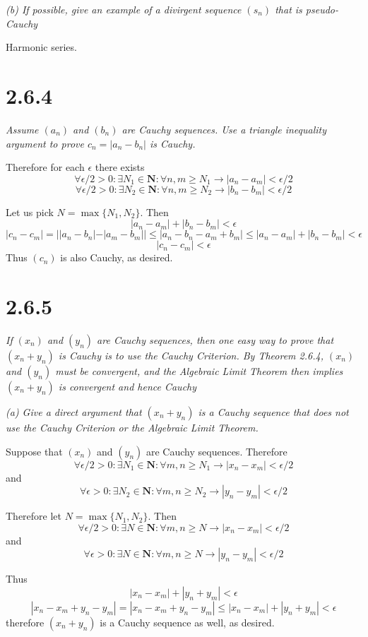 \documentclass[11pt,oneside,titlepage]{book}
\begin{document}
\textit{(b) If possible, give an example of a divirgent sequence $(s_n)$ that
  is pseudo-Cauchy}

Harmonic series.

\section*{2.6.4}
\textit{Assume $(a_n)$ and $(b_n)$ are Cauchy sequences. Use a triangle
  inequality argument to prove $c_n = |a_n - b_n|$ is Cauchy.}

Therefore for each $\epsilon$ there exists
$$\forall \epsilon/2 > 0: \exists N_1 \in \textbf{N}: \forall n,m \geq N_1 \to
|a_n - a_m| < \epsilon/2$$
$$\forall \epsilon/2 > 0: \exists N_2 \in \textbf{N}: \forall n,m \geq N_2 \to
|b_n - b_m| < \epsilon/2$$

Let us pick $N = \max\{N_1, N_2\}$. Then
$$|a_n - a_m| + |b_n - b_m| < \epsilon$$
$$|c_n - c_m| = ||a_n - b_n| - |a_m - b_m|| \leq |a_n - b_n - a_m + b_m|
\leq |a_n - a_m| + |b_n - b_m| < \epsilon$$
$$|c_n - c_m|  < \epsilon$$
Thus $(c_n)$ is also Cauchy, as desired.

\section*{2.6.5}
\textit{If $(x_n)$ and $(y_n)$ are Cauchy sequences, then one easy way to
  prove that $(x_n + y_n)$ is Cauchy is to use the Cauchy Criterion. By
  Theorem 2.6.4, $(x_n)$ and $(y_n)$ must be convergent, and the Algebraic
  Limit Theorem then implies $(x_n + y_n)$ is convergent and hence Cauchy}

\textit{(a) Give a direct argument that $(x_n + y_n)$ is a Cauchy
  sequence that does not use the Cauchy Criterion or the Algebraic Limit
  Theorem.}

Suppose that $(x_n)$ and $(y_n)$ are Cauchy sequences. Therefore
$$\forall \epsilon/2 > 0: \exists N_1 \in \textbf{N}: \forall m,n \geq N_1 \to
|x_n - x_m| < \epsilon/2$$
and
$$\forall \epsilon > 0: \exists N_2 \in \textbf{N}: \forall m,n \geq N_2 \to
|y_n - y_m| < \epsilon/2$$

Therefore let $N = \max\{N_1, N_2\}$. Then
$$\forall \epsilon/2 > 0: \exists N \in \textbf{N}: \forall m,n \geq N \to
|x_n - x_m| < \epsilon/2$$
and
$$\forall \epsilon > 0: \exists N \in \textbf{N}: \forall m,n \geq N \to
|y_n - y_m| < \epsilon/2$$

Thus
$$|x_n - x_m| + |y_n + y_m| < \epsilon$$
$$|x_n - x_m + y_n - y_m | = |x_n - x_m + y_n - y_m| \leq |x_n - x_m| + |y_n + y_m| < \epsilon$$
therefore $(x_n + y_n)$ is a Cauchy sequence as well, as desired.
\end{document}
